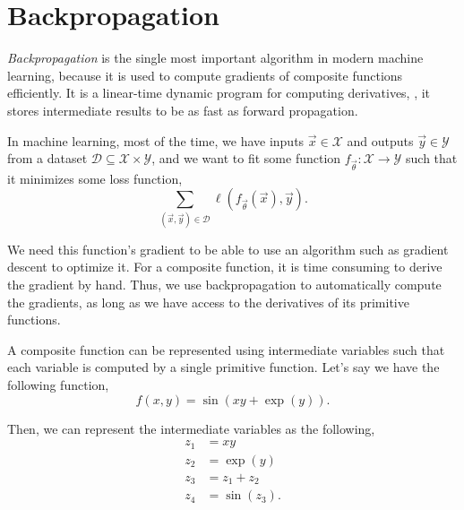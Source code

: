 \section{Backpropagation} \label{sec:backpropagation}

\textit{Backpropagation} is the single most important algorithm in modern
machine learning, because it is used to compute gradients of composite
functions efficiently. It is a linear-time dynamic program for computing
derivatives, \ie, it stores intermediate results to be as fast as forward
propagation.

In machine learning, most of the time, we have inputs $\vec{x}\in\mathcal{X}$
and outputs $\vec{y}\in\mathcal{Y}$ from a dataset
$\mathcal{D}\subseteq\mathcal{X}\times\mathcal{Y}$, and we want to fit some
function $f_{\vec{\theta}}: \mathcal{X} \to \mathcal{Y}$ such that it minimizes
some loss function, \[
    \sum_{(\vec{x},\vec{y})\in\mathcal{D}} \ell(f_{\vec{\theta}}(\vec{x}),\vec{y}).
\]

We need this function's gradient to be able to use an algorithm such as
gradient descent to optimize it. For a composite function, it is time
consuming to derive the gradient by hand. Thus, we use backpropagation to
automatically compute the gradients, as long as we have access to the
derivatives of its primitive functions.

\begin{example}
    \label{ex:comp-graph}

    A composite function can be represented using intermediate variables such
    that each variable is computed by a single primitive function. Let's say we
    have the following function, \[
        f(x,y)=\sin(xy + \exp(y)).
    \]

    Then, we can represent the intermediate variables as the following,
    \begin{align*}
        z_1 & = xy         \\
        z_2 & = \exp(y)    \\
        z_3 & = z_1 + z_2  \\
        z_4 & = \sin(z_3).
    \end{align*}

\end{example}

